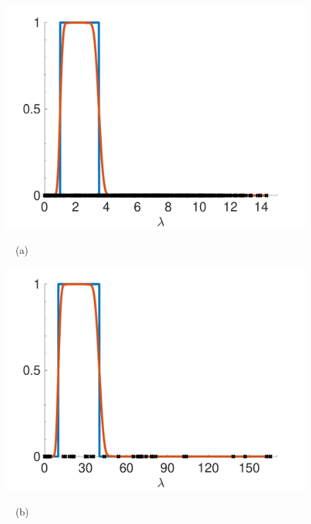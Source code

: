 \documentclass[journal, 10pt]{IEEEtran}
\begin{document}
\begin{figure}[tbh]
\begin{minipage}[m]{0.49\linewidth}
\centerline{\includegraphics[width=1.1\linewidth]{fig_approx_filter_sensor}}
\centerline{~~\small{(a)}}
\end{minipage}
\begin{minipage}[m]{0.49\linewidth}
\centerline{\includegraphics[width=1.1\linewidth]{fig_approx_filter_net25}}
\centerline{~~\small{(b)}}
\end{minipage} \\
\begin{minipage}[m]{0.49\linewidth}

\end{minipage}
\end{figure}
\end{document}
